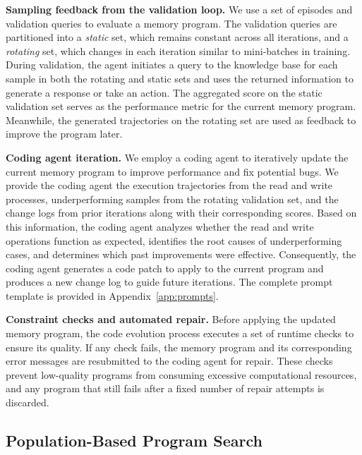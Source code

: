 \textbf{Sampling feedback from the validation loop.}
We use a set of episodes and validation queries to evaluate a memory program.
The validation queries are partitioned into a \textit{static} set, which remains constant across all iterations, and a \textit{rotating} set, which changes in each iteration similar to mini-batches in training.
During validation, the agent initiates a query to the knowledge base for each sample in both the rotating and static sets and uses the returned information to generate a response or take an action.
The aggregated score on the static validation set serves as the performance metric for the current memory program.
Meanwhile, the generated trajectories on the rotating set are used as feedback to improve the program later.

\textbf{Coding agent iteration.}
We employ a coding agent to iteratively update the current memory program to improve performance and fix potential bugs.
We provide the coding agent the execution trajectories from the read and write processes, underperforming samples from the rotating validation set, and the change logs from prior iterations along with their corresponding scores.
Based on this information, the coding agent analyzes whether the read and write operations function as expected, identifies the root causes of underperforming cases, and determines which past improvements were effective.
Consequently, the coding agent generates a code patch to apply to the current program and produces a new change log to guide future iterations.
The complete prompt template is provided in Appendix~\ref{app:prompts}.

\textbf{Constraint checks and automated repair.}
Before applying the updated memory program, the code evolution process executes a set of runtime checks to ensure its quality.
If any check fails, the memory program and its corresponding error messages are resubmitted to the coding agent for repair. These checks prevent low-quality programs from consuming excessive computational resources, and any program that still fails after a fixed number of repair attempts is discarded.

\subsection{Population-Based Program Search}
\label{sec:population}

